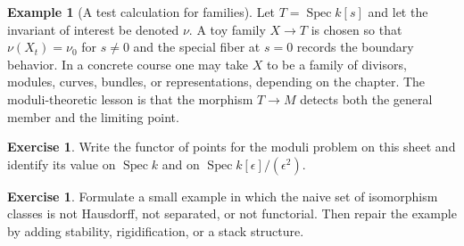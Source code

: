 \documentclass[11pt]{amsart}
\theoremstyle{definition}
\newtheorem{example}[theorem]{Example}
\newtheorem{exercise}[theorem]{Exercise}
\newcommand{\Spec}{\operatorname{Spec}}
\begin{document}
\begin{example}[A test calculation for families]
Let $T=\Spec k[s]$ and let the invariant of interest be denoted $\nu$.  A toy family $X\to T$ is chosen so that $\nu(X_t)=\nu_0$ for $s\ne0$ and the special fiber at $s=0$ records the boundary behavior.  In a concrete course one may take $X$ to be a family of divisors, modules, curves, bundles, or representations, depending on the chapter.  The moduli-theoretic lesson is that the morphism $T\to M$ detects both the general member and the limiting point.
\end{example}
\begin{exercise}
Write the functor of points for the moduli problem on this sheet and identify its value on $\Spec k$ and on $\Spec k[\epsilon]/(\epsilon^2)$.
\end{exercise}
\begin{exercise}
Formulate a small example in which the naive set of isomorphism classes is not Hausdorff, not separated, or not functorial.  Then repair the example by adding stability, rigidification, or a stack structure.
\end{exercise}
\clearpage
\end{document}
